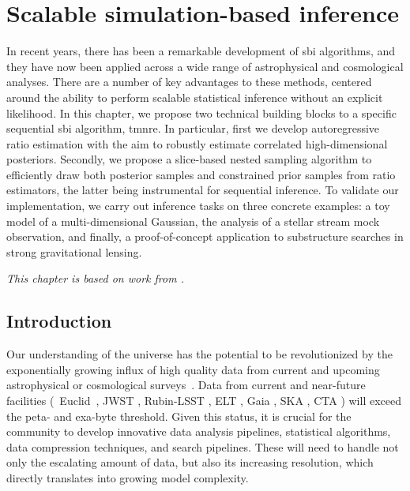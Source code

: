 
\chapter{Scalable simulation-based inference} \label{cha:anre}

In recent years, there has been a remarkable development of \gls*{sbi} algorithms, and they have now been applied across a wide range of astrophysical and cosmological analyses. There are a number of key advantages to these methods, centered around the ability to perform scalable statistical inference without an explicit likelihood. In this chapter, we propose two technical building blocks to a specific sequential \gls*{sbi} algorithm, \gls*{tmnre}. In particular, first we develop autoregressive ratio estimation with the aim to robustly estimate correlated high-dimensional posteriors. Secondly, we propose a slice-based nested sampling algorithm to efficiently draw both posterior samples and constrained prior samples from ratio estimators, the latter being instrumental for sequential inference. To validate our implementation, we carry out inference tasks on three concrete examples: a toy model of a multi-dimensional Gaussian, the analysis of a stellar stream mock observation, and finally, a proof-of-concept application to substructure searches in strong gravitational lensing. 

\textit{This chapter is based on work from \cite{AnauMontel:2023stj}.}


\section{Introduction} \label{sec:anre-intro}

Our understanding of the universe has the potential to be revolutionized by the exponentially growing influx of high quality data from current and upcoming astrophysical or cosmological surveys~\cite{DiValentino:2020vhf}. Data from current and near-future facilities (\eg~Euclid~\cite{EUCLID:2011zbd}, JWST \cite{Gardner:2006ky}, Rubin-LSST \cite{LSSTDarkEnergyScience:2012kar}, ELT \cite{Neichel:2018aa}, Gaia \cite{Prusti:2016aa}, SKA \cite{Lazio:2009aa}, CTA \cite{Knodlseder:2020onx}) will exceed the peta- and exa-byte threshold. Given this status, it is crucial for the community to develop innovative data analysis pipelines, statistical algorithms, data compression techniques, and search pipelines. These will need to handle not only the escalating amount of data, but also its increasing resolution, which directly translates into growing model complexity.

